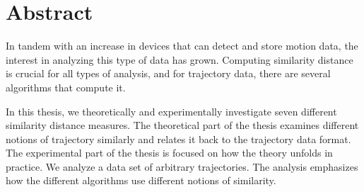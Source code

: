 \chapter*{Abstract}

In tandem with an increase in devices that can detect and store motion data, the interest in analyzing this type of data has grown.
Computing similarity distance is crucial for all types of analysis, and for trajectory data, there are several algorithms that compute it.  

In this thesis, we theoretically and experimentally investigate seven different similarity distance measures.
The theoretical part of the thesis examines different notions of trajectory similarly and relates it back to the trajectory data format. 
The experimental part of the thesis is focused on how the theory unfolds in practice.
We analyze a data set of arbitrary trajectories. 
The analysis emphasizes how the different algorithms use different notions of similarity.

